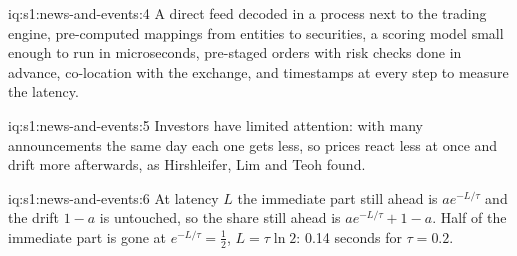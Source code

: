 \begin{solution}{iq:s1:news-and-events:4}
A direct feed decoded in a process next to the trading engine, pre-computed mappings from entities to securities, a scoring model small enough to run in
microseconds, pre-staged orders with risk checks done in advance, co-location with the exchange, and timestamps at every step to measure the latency.
\end{solution}

\begin{solution}{iq:s1:news-and-events:5}
Investors have limited attention: with many announcements the same day each one gets less, so prices react less at once and drift more afterwards, as
Hirshleifer, Lim and Teoh found.
\end{solution}

\begin{solution}{iq:s1:news-and-events:6}
At latency $L$ the immediate part still ahead is $a e^{-L/\tau}$ and the drift $1 - a$ is untouched, so the share still ahead is $a e^{-L/\tau} + 1 - a$.
Half of the immediate part is gone at $e^{-L/\tau} = \tfrac12$, $L = \tau \ln 2$: 0.14 seconds for $\tau = 0.2$.
\end{solution}
